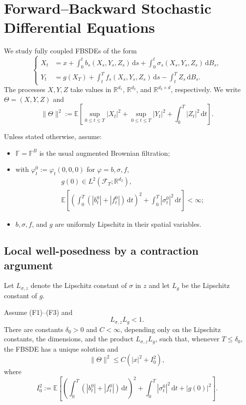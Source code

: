 \chapter{Forward--Backward Stochastic Differential Equations}

We study fully coupled FBSDEs of the form
\[
\left\{
\begin{aligned}
  X_t
  &=x+\int_0^t b_s(X_s,Y_s,Z_s)\,\mathrm ds
      +\int_0^t\sigma_s(X_s,Y_s,Z_s)\,\mathrm dB_s,\\
  Y_t
  &=g(X_T)+\int_t^T f_s(X_s,Y_s,Z_s)\,\mathrm ds
      -\int_t^T Z_s\,\mathrm dB_s.
\end{aligned}
\right.
\]
The processes $X,Y,Z$ take values in
$\mathbb R^{d_1}$, $\mathbb R^{d_2}$, and
$\mathbb R^{d_2\times d}$, respectively.  We write
$\Theta=(X,Y,Z)$ and
\[
  \|\Theta\|^2
  :=\mathbb E\!\left[
    \sup_{0\le t\le T}|X_t|^2
    +\sup_{0\le t\le T}|Y_t|^2
    +\int_0^T|Z_t|^2\,\mathrm dt
  \right].
\]

Unless stated otherwise, assume:
\begin{itemize}
  \item[(F1)] $\mathbb F=\mathbb F^B$ is the usual augmented Brownian
  filtration;
  \item[(F2)] with $\varphi_t^0:=\varphi_t(0,0,0)$ for
  $\varphi=b,\sigma,f$,
  \[
  \begin{gathered}
    g(0)\in L^2(\mathcal F_T;\mathbb R^{d_2}),\\
    \mathbb E\!\left[
      \left(\int_0^T(|b_t^0|+|f_t^0|)\,\mathrm dt\right)^2
      +\int_0^T|\sigma_t^0|^2\,\mathrm dt
    \right]<\infty;
  \end{gathered}
  \]
  \item[(F3)] $b,\sigma,f$, and $g$ are uniformly Lipschitz in their
  spatial variables.
\end{itemize}

\section{Local well-posedness by a contraction argument}

Let $L_{\sigma,z}$ denote the Lipschitz constant of $\sigma$ in $z$ and
let $L_g$ be the Lipschitz constant of $g$.

\begin{thm}
Assume \textup{(F1)}--\textup{(F3)} and
\[
  L_{\sigma,z}L_g<1.
\]
There are constants $\delta_0>0$ and $C<\infty$, depending only on the
Lipschitz constants, the dimensions, and the product
$L_{\sigma,z}L_g$, such that, whenever $T\le\delta_0$, the FBSDE has a
unique solution and
\[
  \|\Theta\|^2\le C(|x|^2+I_0^2),
\]
where
\[
  I_0^2:=\mathbb E\!\left[
    \left(\int_0^T(|b_t^0|+|f_t^0|)\,\mathrm dt\right)^2
    +\int_0^T|\sigma_t^0|^2\,\mathrm dt
    +|g(0)|^2
  \right].
\]
\end{thm}

